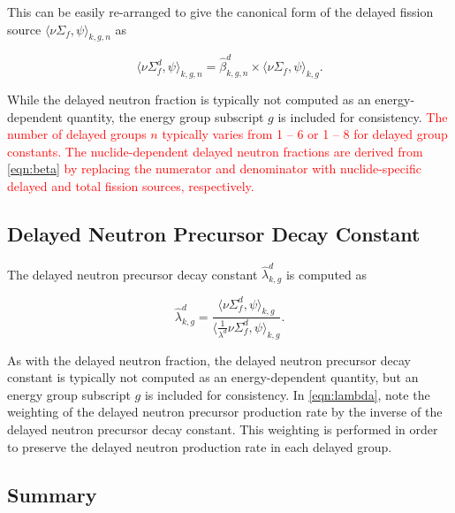 \color{red}
\noindent This can be easily re-arranged to give the canonical form of the delayed fission source $\langle \nu \Sigma_f, \psi \rangle_{k,g,n}$ as

\begin{equation}
\label{eqn:delayed-fiss-src}
\langle \nu \Sigma_f^d, \psi \rangle_{k,g,n} = \hat{\beta}_{k,g,n}^{d} \times \langle \nu \Sigma_f, \psi \rangle_{k,g}.
\end{equation}

\color{black}
\noindent While the delayed neutron fraction is typically not computed as an energy-dependent quantity, the energy group subscript $g$ is included for consistency. \textcolor{red}{The number of delayed groups $n$ typically varies from 1 -- 6 or 1 -- 8 for delayed group constants. The nuclide-dependent delayed neutron fractions are derived from \cref{eqn:beta} by replacing the numerator and denominator with nuclide-specific delayed and total fission sources, respectively.}

\subsection{Delayed Neutron Precursor Decay Constant}
\label{subsubsec:tally-types-lambda}

The delayed neutron precursor decay constant $\hat{\lambda}_{k,g}^{d}$ is computed as

\begin{equation}
\label{eqn:lambda}
\hat{\lambda}_{k,g}^{d} = \frac{\langle \nu \Sigma_f^d, \psi \rangle_{k,g}}{\Big\langle \frac{1}{\lambda^{d}} \nu \Sigma_f^d, \psi \Big\rangle_{k,g}}.
\end{equation}

\noindent As with the delayed neutron fraction, the delayed neutron precursor decay constant is typically not computed as an energy-dependent quantity, but an energy group subscript $g$ is included for consistency. In \cref{eqn:lambda}, note the weighting of the delayed neutron precursor production rate by the inverse of the delayed neutron precursor decay constant. This weighting is performed in order to preserve the delayed neutron production rate in each delayed group.

\subsection{Summary}
\label{subsec:tally-types-summary}

